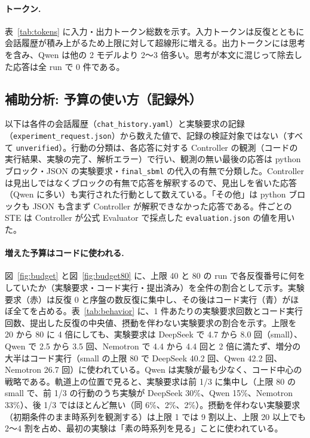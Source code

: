 \documentclass{article}
\providecommand{\unverified}[1]{#1}
\begin{document}
{\tiny\setlength{\tabcolsep}{2pt}}

\paragraph{トークン.}
表~\ref{tab:tokens} に入力・出力トークン総数を示す。入力トークンは反復とともに会話履歴が積み上がるため上限に対して超線形に増える。出力トークンには思考を含み、Qwen は他の 2 モデルより 2〜3 倍多い。思考が本文に混じって除去した応答は全 run で 0 件である。

{\scriptsize\setlength{\tabcolsep}{2.5pt}}

\subsection{補助分析: 予算の使い方（記録外）}
\label{sec:behavior}
以下は各件の会話履歴（\texttt{chat\_history.yaml}）と実験要求の記録（\texttt{experiment\_request.json}）から数えた値で、記録の検証対象ではない（すべて \texttt{unverified}）。行動の分類は、各応答に対する Controller の観測（コードの実行結果、実験の完了、解析エラー）で行い、観測の無い最後の応答は python ブロック・JSON の実験要求・\texttt{final\_sbml} の代入の有無で分類した。Controller は見出しではなくブロックの有無で応答を解釈するので、見出しを省いた応答（Qwen に多い）も実行された行動として数えている。「その他」は python ブロックも JSON も含まず Controller が解釈できなかった応答である。件ごとの STE は Controller が公式 Evaluator で採点した \texttt{evaluation.json} の値を用いた。

\paragraph{増えた予算はコードに使われる.}
図~\ref{fig:budget} と図~\ref{fig:budget80} に、上限 40 と 80 の run で各反復番号に何をしていたか（実験要求・コード実行・提出済み）を全件の割合として示す。実験要求（赤）は反復 0 と序盤の数反復に集中し、その後はコード実行（青）がほぼ全てを占める。表~\ref{tab:behavior} に、1 件あたりの実験要求回数とコード実行回数、提出した反復の中央値、摂動を伴わない実験要求の割合を示す。上限を 20 から 80 に 4 倍にしても、実験要求は DeepSeek で \unverified{4.7} から \unverified{8.0} 回（small）、Qwen で \unverified{2.5} から \unverified{3.5} 回、Nemotron で \unverified{4.4} から \unverified{4.4} 回と 2 倍に満たず、増分の大半はコード実行（small の上限 80 で DeepSeek \unverified{40.2} 回、Qwen \unverified{42.2} 回、Nemotron \unverified{26.7} 回）に使われている。Qwen は実験が最も少なく、コード中心の戦略である。軌道上の位置で見ると、実験要求は前 1/3 に集中し（上限 80 の small で、前 1/3 の行動のうち実験が DeepSeek \unverified{30}\%、Qwen \unverified{15}\%、Nemotron \unverified{33}\%）、後 1/3 ではほとんど無い（同 \unverified{6}\%、\unverified{2}\%、\unverified{2}\%）。摂動を伴わない実験要求（初期条件のまま時系列を観測する）は上限 1 では 9 割以上、上限 20 以上でも 2〜4 割を占め、最初の実験は「素の時系列を見る」ことに使われている。
\end{document}
